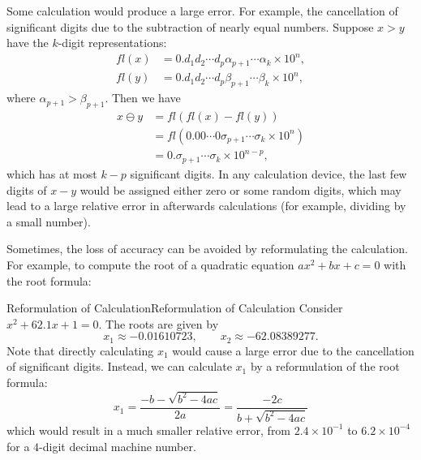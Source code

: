 \documentclass[../main.tex]{subfiles}
\begin{document}
Some calculation would produce a large error. For example, the cancellation of significant digits due to the subtraction of nearly equal numbers. Suppose $x>y$ have the $k$-digit representations:
\begin{equation*}
  \begin{aligned}
    fl(x) &= 0.d_1 d_2 \cdots d_p \alpha_{p+1} \cdots \alpha_k \times 10^n,\\
    fl(y) &= 0.d_1 d_2 \cdots d_p \beta_{p+1} \cdots \beta_k \times 10^n,
  \end{aligned}
\end{equation*}
where $\alpha_{p+1} > \beta_{p+1}$. Then we have
\begin{equation*}
  \begin{aligned}
    x \ominus y &= fl(fl(x) - fl(y))\\
    &= fl\left(0.00 \cdots 0 \sigma_{p+1} \cdots \sigma_k \times 10^n\right)\\
    &= 0. \sigma_{p+1} \cdots \sigma_k \times 10^{n-p},
  \end{aligned}
\end{equation*}
which has at most $k-p$ significant digits. In any calculation device, the last few digits of $x-y$ would be assigned either zero or some random digits, which may lead to a large relative error in afterwards calculations (for example, dividing by a small number).

Sometimes, the loss of accuracy can be avoided by reformulating the calculation. For example, to compute the root of a quadratic equation $ax^2 + bx + c = 0$ with the root formula:
\begin{example}{Reformulation of Calculation}{Reformulation of Calculation}
  Consider $x^2 + 62.1 x + 1 = 0$. The roots are given by
  \begin{equation*}
    x_1 \approx -0.01610723, \qquad x_2 \approx -62.08389277.
  \end{equation*}
  Note that directly calculating $x_1$ would cause a large error due to the cancellation of significant digits. Instead, we can calculate $x_1$ by a reformulation of the root formula:
  \begin{equation*}
    x_1 = \frac{-b - \sqrt{b^2 - 4ac}}{2a} = \frac{-2c}{b + \sqrt{b^2 - 4ac}}
  \end{equation*}
  which would result in a much smaller relative error, from $2.4 \times 10^{-1}$ to $6.2 \times 10^{-4}$ for a $4$-digit decimal machine number.
\end{example}
\end{document}
